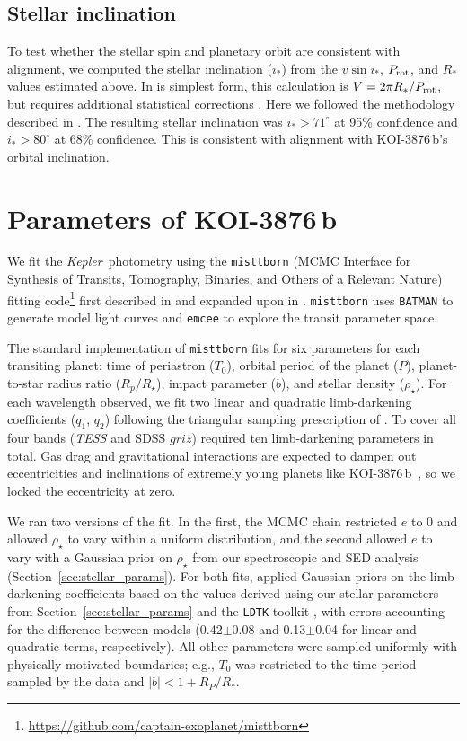 \documentclass[twocolumn]{aastex631}
\newcommand{\planetname}{KOI-3876\,b}
\newcommand{\vsini}{$v\sin{i_*}$}
\newcommand{\kepler}{{\it Kepler}}
\begin{document}
\subsection{Stellar inclination}\label{sec:inc}

To test whether the stellar spin and planetary orbit are consistent with alignment, we computed the stellar inclination ($i_*$) from the \vsini, $P_{\rm{rot}}$, and $R_*$ values estimated above. In is simplest form, this calculation is $V=2\pi R_*/P_{\rm{rot}}$, but requires additional statistical corrections \citep[see ][]{MortonWinn2014, 2020AJ....159...81M}. Here we followed the methodology described in \citet{2020AJ....159...81M}. The resulting stellar inclination was $i_*>71^\circ$ at 95\% confidence and $i_*>80^\circ$ at 68\% confidence. This is consistent with alignment with \planetname's orbital inclination. 

\section{Parameters of \planetname}\label{sec:transit}

We fit the \kepler\ photometry using the \texttt{misttborn} (MCMC Interface for Synthesis of Transits, Tomography, Binaries, and Others of a Relevant Nature) fitting code\footnote{\url{https://github.com/captain-exoplanet/misttborn}} first described in \citet{Mann2016a} and expanded upon in \citet{MISTTBORN}. \texttt{misttborn} uses \texttt{BATMAN} \citep{Kreidberg2015} to generate model light curves and \texttt{emcee} \citep{Foreman-Mackey2013} to explore the transit parameter space. 

The standard implementation of \texttt{misttborn} fits for six parameters for each transiting planet: time of periastron ($T_0$), orbital period of the planet ($P$), planet-to-star radius ratio ($R_p/R_\star$), impact parameter ($b$), and stellar density ($\rho_\star$). For each wavelength observed, we fit two linear and quadratic limb-darkening coefficients ($q_1$, $q_2$) following the triangular sampling prescription of \citet{Kipping2013}. To cover all four bands (\textit{TESS} and SDSS $griz$) required ten limb-darkening parameters in total. Gas drag and gravitational interactions are expected to dampen out eccentricities and inclinations of extremely young planets like \planetname\ \citep{2004ApJ...602..388T}, so we locked the eccentricity at zero.

We ran two versions of the fit. In the first, the MCMC chain restricted $e$ to 0 and allowed $\rho_\star$ to vary within a uniform distribution, and the second allowed $e$ to vary with a Gaussian prior on $\rho_\star$ from our spectroscopic and SED analysis (Section~\ref{sec:stellar_params}). For both fits, applied Gaussian priors on the limb-darkening coefficients based on the values derived using our stellar parameters from Section~\ref{sec:stellar_params} and the \texttt{LDTK} toolkit \citet{2015MNRAS.453.3821P}, with errors accounting for the difference between models (0.42$\pm$0.08 and 0.13$\pm$0.04 for linear and quadratic terms, respectively). All other parameters were sampled uniformly with physically motivated boundaries; e.g., $T_0$ was restricted to the time period sampled by the data and $|b|<1+R_P/R_*$.
\end{document}
